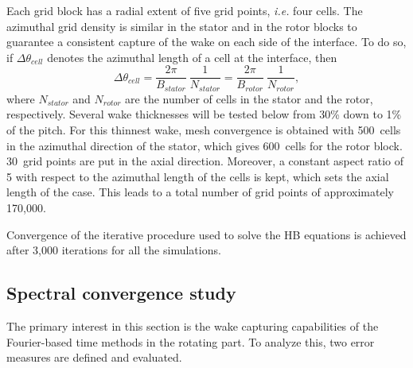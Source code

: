 Each grid block has a radial extent of five grid points, \emph{i.e.} four cells. 
The azimuthal grid density is similar in the stator and in the rotor blocks
to guarantee a consistent capture of the wake on each side of the interface.
To do so, if $\Delta \theta_{cell}$ denotes the azimuthal length of a cell
at the interface, then
\begin{equation}
   \Delta \theta_{cell} = \frac{2\pi}{B_{stator}}~\frac{1}{N_{stator}}
   = \frac{2\pi}{B_{rotor}}~\frac{1}{N_{rotor}},
   \label{eq:az_spatial_discretization_1}
\end{equation}
where $N_{stator}$ and $N_{rotor}$ are the number of cells
in the stator and the rotor, respectively. 
Several wake thicknesses will be tested below
from 30\% down to 1\% of the pitch. For this thinnest wake, 
mesh convergence
is obtained with 500~cells in the azimuthal direction of
the stator, which gives
600~cells for the rotor block.
30~grid points are put in the axial direction. Moreover, a constant
aspect ratio of 5 with respect to the azimuthal length of the cells is
kept, which sets the axial length of the case.
This leads to a total number of grid points of approximately 
170,000. 

Convergence of the iterative procedure used to solve the HB equations is achieved 
after 3,000 iterations for 
all the simulations. 

\subsection{Spectral convergence study}
The primary interest in this section is the wake capturing capabilities of the 
Fourier-based time methods in the rotating part. 
To analyze this, two error measures are defined and
evaluated. 



